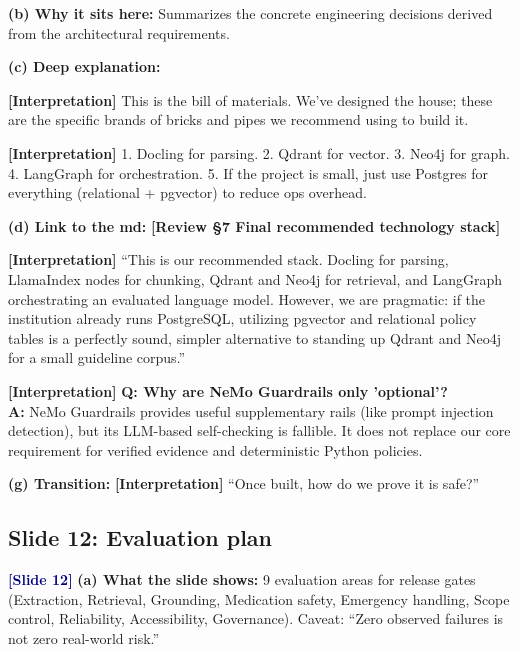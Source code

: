 \documentclass[11pt,a4paper]{article}
\newcommand{\origintag}[2]{\textcolor{#1}{\small\textbf{[#2]}}}
\begin{document}
\textbf{(b) Why it sits here:} Summarizes the concrete engineering decisions derived from the architectural requirements.

\textbf{(c) Deep explanation:}
\begin{analogy}
\origintag{slate}{Interpretation} This is the bill of materials. We've designed the house; these are the specific brands of bricks and pipes we recommend using to build it.
\end{analogy}
\origintag{slate}{Interpretation} 1. Docling for parsing. 2. Qdrant for vector. 3. Neo4j for graph. 4. LangGraph for orchestration. 5. If the project is small, just use Postgres for everything (relational + pgvector) to reduce ops overhead.

\textbf{(d) Link to the md:} \origintag{amber}{Review \S7 Final recommended technology stack}

\begin{sayit}
\origintag{slate}{Interpretation} ``This is our recommended stack. Docling for parsing, LlamaIndex nodes for chunking, Qdrant and Neo4j for retrieval, and LangGraph orchestrating an evaluated language model. However, we are pragmatic: if the institution already runs PostgreSQL, utilizing pgvector and relational policy tables is a perfectly sound, simpler alternative to standing up Qdrant and Neo4j for a small guideline corpus.''
\end{sayit}

\begin{qa}
\origintag{slate}{Interpretation} \textbf{Q: Why are NeMo Guardrails only 'optional'?} \\
\textbf{A:} NeMo Guardrails provides useful supplementary rails (like prompt injection detection), but its LLM-based self-checking is fallible. It does not replace our core requirement for verified evidence and deterministic Python policies.
\end{qa}
\textbf{(g) Transition:} \origintag{slate}{Interpretation} ``Once built, how do we prove it is safe?''
\subsection{Slide 12: Evaluation plan}
\origintag{navy}{Slide 12}
\textbf{(a) What the slide shows:} 9 evaluation areas for release gates (Extraction, Retrieval, Grounding, Medication safety, Emergency handling, Scope control, Reliability, Accessibility, Governance). Caveat: ``Zero observed failures is not zero real-world risk.''
\end{document}
